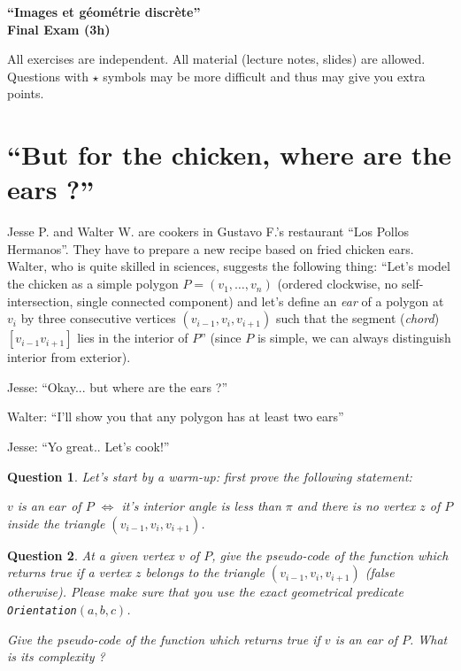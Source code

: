 \documentclass[a4paper, 11pt]{article}
\title{}
\author{}
\date{}
\newtheorem{qu}{Question}
\begin{document}
\begin{center}
	\LARGE \textbf{``Images et g\'eom\'etrie discr\`ete''\\Final Exam (3h)}
\end{center}


All exercises are independent. All material (lecture notes, slides) are
allowed. Questions with $\star$ symbols may be
more difficult and thus may give you extra points. 



\section{``But for the chicken, where are the ears ?''}
\label{sec:but-chicken-where}

Jesse P. and Walter W. are cookers in Gustavo F.'s restaurant ``Los
Pollos Hermanos''.  They have to prepare a new recipe based on fried
chicken ears. Walter, who is quite skilled in sciences, suggests the
following thing: ``Let's model the chicken as a simple polygon
$P=(v_1,\ldots,v_n)$  (ordered clockwise, no self-intersection, single connected
component) and let's define an \emph{ear} of a polygon at $v_i$ by three
consecutive vertices $(v_{i-1},v_i,v_{i+1})$ such that the  segment
(\emph{chord})
$[v_{i-1}v_{i+1}]$ lies in the interior of $P$'' (since $P$ is simple,
we can always distinguish  interior from exterior).

Jesse: ``Okay... but where are the ears ?''

Walter: ``I'll show you that any polygon has at least two ears''

Jesse: ``Yo great.. Let's cook!''


\begin{qu}
  Let's start by a warm-up: first prove the following statement:
  \begin{center}
    $v$ is an $ear$ of $P$ $\Leftrightarrow$ it's interior angle is
    less than $\pi$ and
    there is no vertex $z$ of $P$ inside the triangle
    $(v_{i-1},v_i,v_{i+1})$.
  \end{center}
\end{qu}


\begin{qu}
  At a given vertex $v$ of $P$, give the pseudo-code of the function
  which returns true if a vertex $z$ belongs to the triangle
  $(v_{i-1},v_i,v_{i+1})$ (false otherwise). Please make sure that you
  use the exact geometrical predicate \texttt{Orientation}$(a,b,c)$.

  Give the pseudo-code of the function which returns true if $v$ is an
  ear of $P$.  What is its complexity ?
\end{qu}
\end{document}

